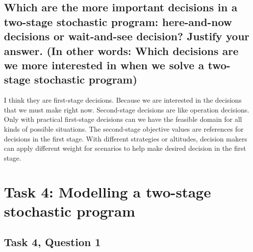 \documentclass[fleqn,10pt]{wlscirep}
\begin{document}
\subsection{Which are the more important decisions in a two-stage stochastic program: here-and-now decisions or wait-and-see decision? Justify your answer. (In other words: Which decisions are we more interested in when we solve a two-stage stochastic program)}

I think they are first-stage decisions. Because we are interested in the decisions that we must make right now. Second-stage decisions are like operation decisions. Only with practical first-stage decisions can we have the feasible domain for all kinds of possible situations. The second-stage objective values are references for decisions in the first stage. With different strategies or altitudes, decision makers can apply different weight for scenarios to help make desired decision in the first stage.

\section{Task 4: Modelling a two-stage stochastic program}

\subsection{Task 4, Question 1}
\end{document}
